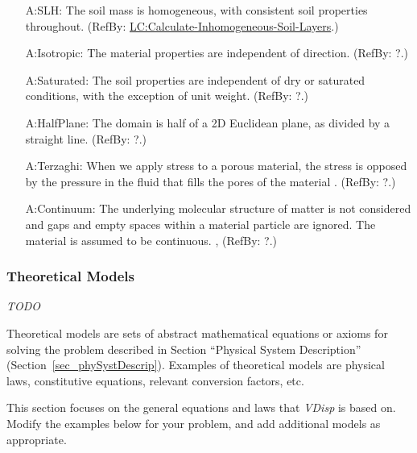 \documentclass[12pt]{article}
\begin{document}
\begin{itemize}
  
  \item[A:SLH:\phantomsection\label{A:SLH}]{The soil mass is homogeneous,
  with consistent soil properties throughout. (RefBy:
  \hyperref[LC_inhomogeneous]{LC:Calculate-Inhomogeneous-Soil-Layers}.)}

  \item[A:Isotropic:\phantomsection\label{A:Isotropic}]{The material properties are independent of direction. (RefBy: ?.)}

  \item [A:Saturated:\phantomsection\label{A:Saturated}]{The soil properties are
  independent of dry or saturated conditions, with the exception of unit weight.
  (RefBy: ?.)}
          
  \item [A:HalfPlane:\phantomsection\label{A:HalfPlane}]{The domain is half of a
  2D Euclidean plane, as divided by a straight line. (RefBy: ?.)}

  \item [A:Terzaghi:\phantomsection\label{A:Terzaghi}]{When we apply stress to a
  porous material, the stress is opposed by the pressure in the fluid that fills
  the pores of the material \citep{WikipediaTerzaghi2022}. (RefBy: ?.)}

  \item [A:Continuum:\phantomsection\label{A:Continuum}]{The underlying molecular structure of matter is not considered and gaps and empty spaces within a material particle are ignored. The material is assumed to be continuous. \citep[p.\ 33--34]{Long1961}, \citep[p.\ 1-2]{Malvern1969} (RefBy: ?.)}
  
\end{itemize}
  
\subsubsection{Theoretical Models}\label{sec_theoretical}

\emph{TODO}

Theoretical models are sets of abstract mathematical equations or axioms for
solving the problem described in Section ``Physical System Description''
(Section~\ref{sec_phySystDescrip}). Examples of theoretical models are physical
laws, constitutive equations, relevant conversion factors, etc.

This section focuses on the general equations and laws that \emph{VDisp}{} is
based on.  Modify the examples below for your problem, and add additional models
as appropriate.
\end{document}
